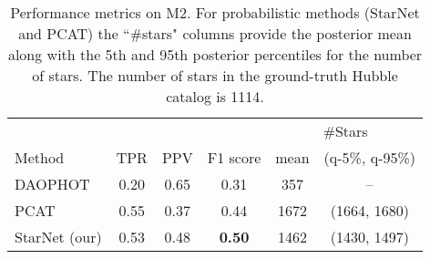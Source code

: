 
\begin{table}[!tb]
\centering
\caption{Performance metrics on M2.
For probabilistic methods (StarNet and PCAT)
the ``\#stars" columns provide the posterior mean along with the 5th and 95th posterior percentiles
for the number of stars.
The number of stars in the ground-truth Hubble catalog is 1114. }
\label{tab:summary_stats}
\begin{tabular}{l|ccc|cc}
\toprule
& & & & \multicolumn{2}{c}{\#Stars} \\
     Method &   TPR &   PPV &  F1 score &  mean & (q-5\%, q-95\%)\\
\midrule
    DAOPHOT &  0.20 &  0.65 &      0.31 &     357 & -- \\
       PCAT &  0.55 &  0.37 &      0.44 &    1672 & (1664, 1680)\\
 StarNet (our) &  0.53 &  0.48 &      \textbf{0.50} &    1462 & (1430, 1497)\\
\bottomrule
\end{tabular}
\end{table}
